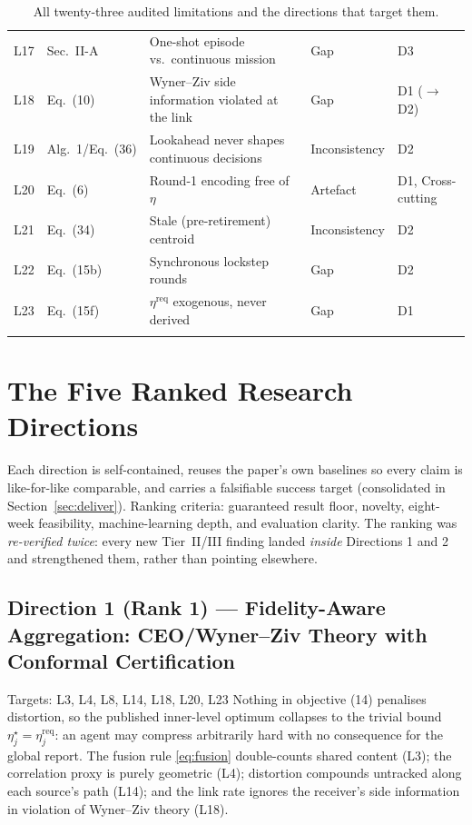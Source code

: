 \documentclass[11pt,a4paper]{article}
\begin{document}
\begin{center}
\begin{longtable}{@{}c l p{6.9cm} l l@{}}
L17 & Sec.~II-A & One-shot episode vs.\ continuous mission & Gap & D3 \\
L18 & Eq.~(10) & Wyner--Ziv side information violated at the link & Gap & D1 ($\to$D2) \\
L19 & Alg.~1/Eq.~(36) & Lookahead never shapes continuous decisions & Inconsistency & D2 \\
L20 & Eq.~(6) & Round-1 encoding free of $\eta$ & Artefact & D1, Cross-cutting \\
L21 & Eq.~(34) & Stale (pre-retirement) centroid & Inconsistency & D2 \\
L22 & Eq.~(15b) & Synchronous lockstep rounds & Gap & D2 \\
L23 & Eq.~(15f) & $\eta^{\mathrm{req}}$ exogenous, never derived & Gap & D1 \\
\bottomrule
\caption{All twenty-three audited limitations and the directions that target them.}
\label{tab:master}
\end{longtable}
\end{center}

\section{The Five Ranked Research Directions}
\label{sec:directions}

Each direction is self-contained, reuses the paper's own baselines so every claim is like-for-like comparable, and carries a falsifiable success target (consolidated in Section~\ref{sec:deliver}). Ranking criteria: guaranteed result floor, novelty, eight-week feasibility, machine-learning depth, and evaluation clarity. The ranking was \emph{re-verified twice}: every new Tier~II/III finding landed \emph{inside} Directions 1 and 2 and strengthened them, rather than pointing elsewhere.

\subsection{Direction 1 (Rank 1) --- Fidelity-Aware Aggregation: CEO/Wyner--Ziv Theory with Conformal Certification}
\label{sec:d1}

\begin{limitbox}{Targets: L3, L4, L8, L14, L18, L20, L23}
Nothing in objective (14) penalises distortion, so the published inner-level optimum collapses to the trivial bound $\eta_j^{\star}=\eta_j^{\mathrm{req}}$: an agent may compress arbitrarily hard with no consequence for the global report. The fusion rule \eqref{eq:fusion} double-counts shared content (L3); the correlation proxy is purely geometric (L4); distortion compounds untracked along each source's path (L14); and the link rate ignores the receiver's side information in violation of Wyner--Ziv theory (L18).
\end{limitbox}
\end{document}
